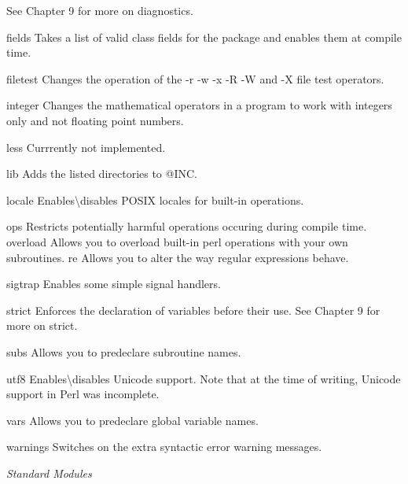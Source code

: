 \documentclass[a4paper,11pt]{book}
\begin{document}
\noindent See Chapter 9 for more on diagnostics.

\noindent 

\noindent fields Takes a list of valid class fields for the package and enables them at compile time.

\noindent 

\noindent filetest Changes the operation of the -r -w -x -R -W and -X file test operators.

\noindent 

\noindent integer Changes the mathematical operators in a program to work with integers only and not floating point numbers.

\noindent 

\noindent less Currrently not implemented.

\noindent 

\noindent lib Adds the listed directories to @INC.

\noindent 

\noindent locale Enables\textbackslash disables POSIX locales for built-in operations.

\noindent 

\noindent ops Restricts potentially harmful operations occuring during compile time. overload Allows you to overload built-in perl operations with your own subroutines. re Allows you to alter the way regular expressions behave.

\noindent sigtrap Enables some simple signal handlers.

\noindent 

\noindent strict Enforces the declaration of variables before their use. See Chapter 9 for more on strict.

\noindent 

\noindent subs Allows you to predeclare subroutine names.

\noindent 

\noindent utf8 Enables\textbackslash  disables Unicode support. Note that at the time of writing, Unicode support in Perl was incomplete.

\noindent 

\noindent vars Allows you to predeclare global variable names.

\noindent 

\noindent warnings Switches on the extra syntactic error warning messages.

\noindent 

\noindent 

\noindent \textit{Standard Modules}
\end{document}
